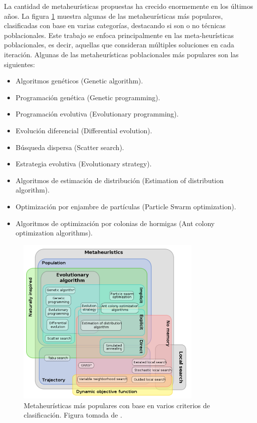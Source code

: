 La cantidad de metaheurísticas propuestas ha crecido enormemente en los últimos años.
%
La figura \ref{fig:clasificacion} muestra algunas de las metaheurísticas más populares, clasificadas con base
en varias categorías, destacando si son o no técnicas poblacionales.
%
Este trabajo se enfoca principalmente en las meta-heurísticas poblacionales, es decir,
aquellas que consideran múltiples soluciones en cada iteración. 
%
Algunas de las metaheurísticas poblacionales más populares son las siguientes:
\begin{itemize}
	\item Algoritmos genéticos (Genetic algorithm).
	\item Programación genética (Genetic programming).
	\item Programación evolutiva (Evolutionary programming).
	\item Evolución diferencial (Differential evolution).
	\item Búsqueda dispersa (Scatter search).
	\item Estrategia evolutiva (Evolutionary strategy).
	\item Algoritmos de estimación de distribución (Estimation of distribution algorithm).
	\item Optimización por enjambre de partículas (Particle Swarm optimization).
	\item Algoritmos de optimización por colonias de hormigas (Ant colony optimization algorithms).
\end{itemize}

\begin{figure}[H]
\centering
\includegraphics[width=0.8\textwidth]{clasificacion.png}
\caption{Metaheurísticas más populares con base en varios criterios de clasificación. Figura tomada de \cite{beheshti2013review}.}
\label{fig:clasificacion}
\end{figure}



